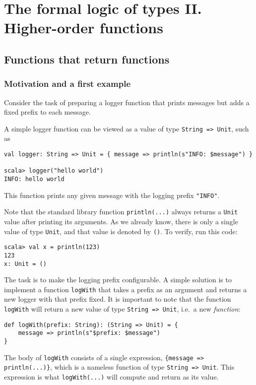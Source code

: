 
\chapter{The formal logic of types II. Higher-order functions\label{chap:Higher-order-functions} }

\section{Functions that return functions}

\subsection{Motivation and a first example}

Consider the task of preparing a logger function that prints messages
but adds a fixed prefix to each message. 

A simple logger function can be viewed as a value of type \lstinline!String => Unit!,
such as
\begin{lstlisting}
val logger: String => Unit = { message => println(s"INFO: $message") }

scala> logger("hello world")
INFO: hello world
\end{lstlisting}
This function prints any given message with the logging prefix \lstinline!"INFO"!. 

Note that the standard library function \lstinline!println(...)!
always returns a \lstinline!Unit! value after printing its arguments.
As we already know, there is only a single value of type \lstinline!Unit!,
and that value is denoted by \lstinline!()!. To verify, run this
code:
\begin{lstlisting}
scala> val x = println(123)
123
x: Unit = ()
\end{lstlisting}

The task is to make the logging prefix configurable. A simple solution
is to implement a function \lstinline!logWith! that takes a prefix
as an argument and returns a new logger with that prefix fixed. It
is important to note that the function \lstinline!logWith! will return
a new value of type \lstinline!String => Unit!, i.e.~a new \emph{function}:
\begin{lstlisting}
def logWith(prefix: String): (String => Unit) = {
    message => println(s"$prefix: $message")
}
\end{lstlisting}
The body of \lstinline!logWith! consists of a single expression,
\lstinline!{message => println(...)}!, which is a nameless function
of type \lstinline!String => Unit!. This expression is what \lstinline!logWith(...)!
will compute and return as its value.

